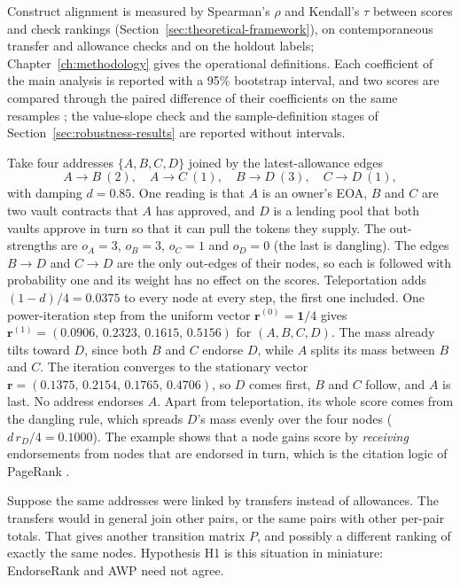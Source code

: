 
Construct alignment is measured by Spearman's $\rho$ and Kendall's $\tau$ between scores and check rankings (Section~\ref{sec:theoretical-framework}), on contemporaneous transfer and allowance checks and on the holdout labels; Chapter~\ref{ch:methodology} gives the operational definitions. Each coefficient of the main analysis is reported with a 95\% bootstrap interval, and two scores are compared through the paired difference of their coefficients on the same resamples \parencite{efron1979bootstrap}; the value-slope check and the sample-definition stages of Section~\ref{sec:robustness-results} are reported without intervals.


Take four addresses $\{A,B,C,D\}$ joined by the latest-allowance edges
\[
A\to B\ (2),\quad A\to C\ (1),\quad B\to D\ (3),\quad C\to D\ (1),
\]
with damping $d=0.85$. One reading is that $A$ is an owner's EOA, $B$ and $C$ are two vault contracts that $A$ has approved, and $D$ is a lending pool that both vaults approve in turn so that it can pull the tokens they supply. The out-strengths are $o_A=3$, $o_B=3$, $o_C=1$ and $o_D=0$ (the last is dangling). The edges $B\to D$ and $C\to D$ are the only out-edges of their nodes, so each is followed with probability one and its weight has no effect on the scores. Teleportation adds $(1-d)/4=0.0375$ to every node at every step, the first one included. One power-iteration step from the uniform vector $\mathbf{r}^{(0)}=\mathbf{1}/4$ gives $\mathbf{r}^{(1)}=(0.0906,\,0.2323,\,0.1615,\,0.5156)$ for $(A,B,C,D)$. The mass already tilts toward $D$, since both $B$ and $C$ endorse $D$, while $A$ splits its mass between $B$ and $C$. The iteration converges to the stationary vector $\mathbf{r}=(0.1375,\,0.2154,\,0.1765,\,0.4706)$, so $D$ comes first, $B$ and $C$ follow, and $A$ is last. No address endorses $A$. Apart from teleportation, its whole score comes from the dangling rule, which spreads $D$'s mass evenly over the four nodes ($d\,r_D/4=0.1000$). The example shows that a node gains score by \emph{receiving} endorsements from nodes that are endorsed in turn, which is the citation logic of PageRank \parencite{page1999pagerank}.

Suppose the same addresses were linked by transfers instead of allowances. The transfers would in general join other pairs, or the same pairs with other per-pair totals. That gives another transition matrix $P$, and possibly a different ranking of exactly the same nodes. Hypothesis H1 is this situation in miniature: EndorseRank and AWP need not agree.

